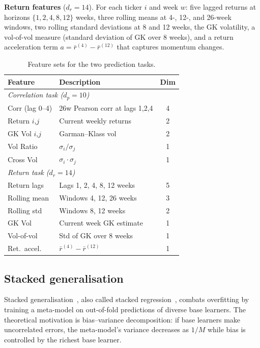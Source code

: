 \documentclass[10pt,twocolumn]{article}
\begin{document}
\textbf{Return features} ($d_r=14$).
For each ticker $i$ and week $w$: five lagged returns at horizons
$\{1,2,4,8,12\}$ weeks, three rolling means at 4-, 12-, and
26-week windows, two rolling standard deviations at 8 and 12 weeks,
the GK volatility, a vol-of-vol measure (standard deviation of GK
over 8 weeks), and a return acceleration term
$a=\bar r^{(4)}-\bar r^{(12)}$ that captures momentum changes.

\begin{table}[!htbp]
\centering
\caption{Feature sets for the two prediction tasks.}
\label{tab:features}
\small
\begin{tabular}{@{}llc@{}}
\toprule
\textbf{Feature} & \textbf{Description} & \textbf{Dim} \\
\midrule
\multicolumn{3}{l}{\textit{Correlation task ($d_p=10$)}} \\
Corr (lag 0--4) & 26w Pearson corr at lags 1,2,4 & 4 \\
Return $i$,$j$  & Current weekly returns & 2 \\
GK Vol $i$,$j$  & Garman--Klass vol & 2 \\
Vol Ratio       & $\sigma_i/\sigma_j$ & 1 \\
Cross Vol       & $\sigma_i\cdot\sigma_j$ & 1 \\
\midrule
\multicolumn{3}{l}{\textit{Return task ($d_r=14$)}} \\
Return lags     & Lags 1, 2, 4, 8, 12 weeks & 5 \\
Rolling mean    & Windows 4, 12, 26 weeks & 3 \\
Rolling std     & Windows 8, 12 weeks & 2 \\
GK Vol          & Current week GK estimate & 1 \\
Vol-of-vol      & Std of GK over 8 weeks & 1 \\
Ret.\ accel.    & $\bar r^{(4)}-\bar r^{(12)}$ & 1 \\
\bottomrule
\end{tabular}
\end{table}

\subsection{Stacked generalisation}

Stacked generalisation~\cite{wolpert1992}, also called stacked
regression~\cite{breiman1996}, combats overfitting by training a
meta-model on out-of-fold predictions of diverse base learners.
The theoretical motivation is bias--variance decomposition: if
base learners make uncorrelated errors, the meta-model's variance
decreases as $1/M$ while bias is controlled by the richest base
learner.
\end{document}
